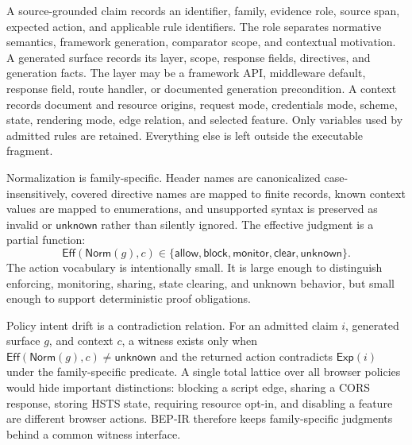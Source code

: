 \documentclass[10pt,conference]{IEEEtran}
\newcommand{\bep}{BEP-IR}
\newcommand{\unknown}{\ensuremath{\mathsf{unknown}}}
\newcommand{\allow}{\ensuremath{\mathsf{allow}}}
\newcommand{\block}{\ensuremath{\mathsf{block}}}
\newcommand{\monitor}{\ensuremath{\mathsf{monitor}}}
\newcommand{\clear}{\ensuremath{\mathsf{clear}}}
\newcommand{\Eff}{\ensuremath{\mathsf{Eff}}}
\newcommand{\Norm}{\ensuremath{\mathsf{Norm}}}
\newcommand{\Exp}{\ensuremath{\mathsf{Exp}}}
\begin{document}
A source-grounded claim records an identifier, family, evidence role, source span, expected action, and applicable rule identifiers. The role separates normative semantics, framework generation, comparator scope, and contextual motivation. A generated surface records its layer, scope, response fields, directives, and generation facts. The layer may be a framework API, middleware default, response field, route handler, or documented generation precondition. A context records document and resource origins, request mode, credentials mode, scheme, state, rendering mode, edge relation, and selected feature.
Only variables used by admitted rules are retained. Everything else is left outside the executable fragment.

Normalization is family-specific. Header names are canonicalized case-insensitively, covered directive names are mapped to finite records, known context values are mapped to enumerations, and unsupported syntax is preserved as invalid or \unknown{} rather than silently ignored. The effective judgment is a partial function:
\[
 \Eff(\Norm(g),c) \in \{\allow,\block,\monitor,\clear,\unknown\}.
\]
The action vocabulary is intentionally small. It is large enough to distinguish enforcing, monitoring, sharing, state clearing, and unknown behavior, but small enough to support deterministic proof obligations.

Policy intent drift is a contradiction relation. For an admitted claim $i$, generated surface $g$, and context $c$, a witness exists only when $\Eff(\Norm(g),c) \neq \unknown$ and the returned action contradicts $\Exp(i)$ under the family-specific predicate. A single total lattice over all browser policies would hide important distinctions: blocking a script edge, sharing a CORS response, storing HSTS state, requiring resource opt-in, and disabling a feature are different browser actions. \bep{} therefore keeps family-specific judgments behind a common witness interface.
\end{document}
